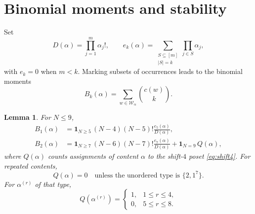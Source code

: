 \documentclass[11pt]{article}
\newtheorem{lemma}[theorem]{Lemma}
\newcommand{\W}{\mathcal W}
\newcommand{\one}{\mathbf 1}
\begin{document}
\section{Binomial moments and stability}

Set
\[
 D(\alpha)=\prod_{j=1}^m\alpha_j!,
 \qquad
 e_k(\alpha)=\sum_{\substack{S\subseteq[m]\\|S|=k}}
                    \prod_{j\in S}\alpha_j,
\]
with $e_k=0$ when $m<k$.  Marking subsets of occurrences leads to the
binomial moments
\[
 B_k(\alpha)=\sum_{w\in\W_\alpha}\binom{c(w)}k.
\]

\begin{lemma}\label{lem:moments}
For $N\leq9$,
\begin{align}
 B_1(\alpha)
   &=\one_{N\geq5}\,(N-4)(N-5)!\frac{e_5(\alpha)}{D(\alpha)},
       \label{eq:B1}\\
 B_2(\alpha)
   &=\one_{N\geq7}\,(N-6)(N-7)!\frac{e_7(\alpha)}{D(\alpha)}
     +\one_{N=9}\,Q(\alpha),                         \label{eq:B2}
\end{align}
where $Q(\alpha)$ counts assignments of content $\alpha$ to the
shift-$4$ poset \eqref{eq:shift4}.  For repeated contents,
\[
 Q(\alpha)=0
 \quad\text{unless the unordered type is }\{2,1^7\}.
\]
For $\alpha^{(r)}$ of that type,
\begin{equation}\label{eq:Q}
 Q(\alpha^{(r)})=
 \begin{cases}1,&1\leq r\leq4,\\0,&5\leq r\leq8.
 \end{cases}
\end{equation}
\end{lemma}
\end{document}
